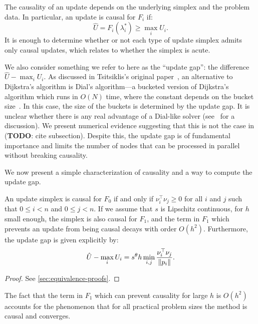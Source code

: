 \documentclass[sisc-eikonal.tex]{subfiles}
\begin{document}
The causality of an update depends on the underlying simplex and the
problem data. In particular, an update is causal for $F_i$ if:
\begin{equation}
  \hat{U} = F_i(\lambda_i^*) \geq \max_i U_i.
\end{equation}
It is enough to determine whether or not each type of update simplex
admits only causal updates, which relates to whether the simplex is
acute.

We also consider something we refer to here as the ``update gap'': the
difference $\hat{U} - \max_i U_i$. As discussed in Tsitsiklis's
original paper~\cite{tsitsiklis1995efficient}, an alternative to
Dijkstra's algorithm is Dial's algorithm---a bucketed version of
Dijkstra's algorithm which runs in $O(N)$ time, where the constant
depends on the bucket size~\cite{dial1969algorithm,kim2001calo}. In
this case, the size of the buckets is determined by the update gap. It
is unclear whether there is any real advantage of a Dial-like solver
(see~\cite{jeong2008fast} for a discussion). We present numerical
evidence suggesting that this is not the case in (\textbf{TODO}: cite
subsection). Despite this, the update gap is of fundamental importance
and limits the number of nodes that can be processed in parallel
without breaking causality.

We now present a simple characterization of causality and a way to
compute the update gap.
\begin{theorem}\label{thm:causality}
  An update simplex is causal for $F_0$ if and only if
  $\nu_i^\top \nu_j \geq 0$ for all $i$ and $j$ such that
  $0 \leq i < n$ and $0 \leq j < n$. If we assume that $s$ is
  Lipschitz continuous, for $h$ small enough, the simplex is also
  causal for $F_1$, and the term in $F_1$ which prevents an update
  from being causal decays with order $O(h^2)$. Furthermore, the
  update gap is given explicitly by:
  \begin{equation}
    \hat{U} - \max_i U_i = s^\theta h \min_{i, j} \frac{\nu_i^\top \nu_j}{\left\|p_i\right\|}.
  \end{equation}
\end{theorem}

\begin{proof}
  See \cref{sec:equivalence-proofs}.
\end{proof}

\noindent The fact that the term in $F_1$ which can prevent causality
for large $h$ is $O(h^2)$ accounts for the phenomenon that for all
practical problem sizes the method is causal and converges.
\end{document}
